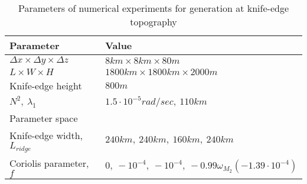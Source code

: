 \documentclass[12pt]{article}
\begin{document}
\begin{table}
	\caption{Parameters of numerical experiments for generation at knife-edge topography}
	\begin{tabular}{ |p{7cm}||p{7cm}|  }
		\hline
		Parameter & Value \\
		\hline
		$\Delta x \times \Delta y \times \Delta z$ & $8km \times 8km \times 80m$ \\
		$L \times W \times H$ & $1800km \times 1800km \times 2000m$ \\
		Knife-edge height & $800m$ \\
		$N^2,~\lambda_1$ & $1.5\cdot 10^{-5}rad/sec,~110km$ \\
		\hline
		\multicolumn{2}{|l|}{Parameter space} \\
		\hline
		Knife-edge width, $L_{ridge}$ & $240km,~240km,~160km,~240km$ \\
		Coriolis parameter, $f$ & $0,~\minus 10^{\minus4},~\minus 10^{\minus4},~\minus 0.99 
		\omega_{M_2}(\minus1.39\cdot10^{\minus4})$ \\
		\hline
	\end{tabular}
	\label{C3:tab.gen.prms}
\end{table}
\end{document}

